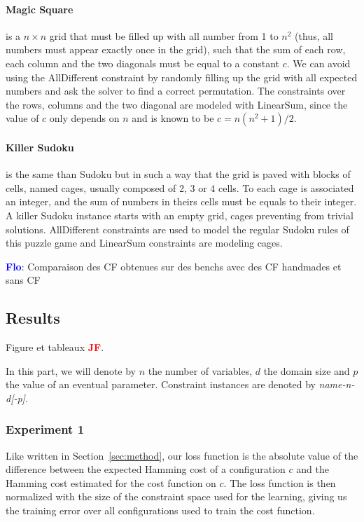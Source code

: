 \documentclass{article}
\newcommand{\flo}{\textcolor{blue}{\bf Flo}\xspace}
\newcommand{\jf}{\textcolor{red}{\bf JF}\xspace}
\begin{document}
\paragraph{Magic Square} is a $n \times n$ grid that must be filled up
with all number from 1 to $n^2$ (thus, all numbers must appear exactly
once in the grid), such that the  sum of each row, each column and the
two diagonals must be equal to a constant $c$.  We can avoid using the
AllDifferent  constraint by  randomly  filling up  the  grid with  all
expected numbers and ask the solver to find a correct permutation. The
constraints over  the rows, columns  and the two diagonal  are modeled
with LinearSum,  since the  value of  $c$ only depends  on $n$  and is
known to be $c = n(n^2 + 1)/2$.

\paragraph{Killer Sudoku}  is the same than  Sudoku but in such  a way
that the  grid is  paved with  blocks of  cells, named  cages, usually
composed of 2, 3  or 4 cells.  To each cage  is associated an integer,
and  the sum  of  numbers in  theirs  cells must  be  equals to  their
integer. A  killer Sudoku  instance starts with  an empty  grid, cages
preventing from  trivial solutions. AllDifferent constraints  are used
to model  the regular Sudoku rules  of this puzzle game  and LinearSum
constraints are modeling cages.

\flo: Comparaison des  CF obtenues sur des  benchs avec des CF  handmades et
sans CF

\subsection{Results}
Figure et tableaux \jf.

In this part, we  will denote by $n$ the number  of variables, $d$ the
domain size  and $p$  the value of  an eventual  parameter. Constraint
instances are denoted by \textit{name-n-d[-p]}.

\subsubsection{Experiment 1}


Like  written in  Section~\ref{sec:method}, our  loss function  is the
absolute value of the difference  between the expected Hamming cost of
a  configuration $c$  and  the  Hamming cost  estimated  for the  cost
function on $c$. The loss function is then normalized with the size of
the constraint  space used  for the learning,  giving us  the training
error over all configurations used to train the cost function.
\end{document}
